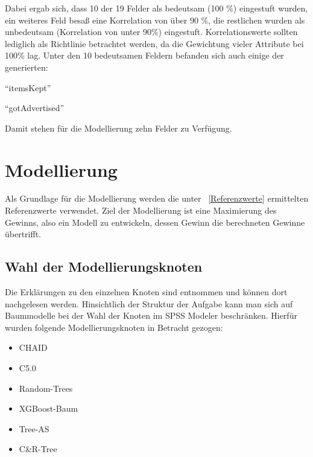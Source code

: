 \documentclass[a4paper,12pt]{article}
\begin{document}
Dabei ergab sich, dass 10 der 19 Felder als bedeutsam (100 \%) eingestuft wurden, ein weiteres Feld besaß eine Korrelation von über 90 \%,
die restlichen wurden als unbedeutsam (Korrelation von unter 90\%) eingestuft.
Korrelationswerte sollten lediglich als Richtlinie betrachtet werden, da die Gewichtung
vieler Attribute bei 100\% lag.  Unter den 10 bedeutsamen Feldern befanden sich auch einige der
generierten:

\vspace{0.2cm}
\par
	\begin{minipage}[h]{.5\textwidth}
	\begin{center}
	"`itemsKept"'
	\end{center}
	\end{minipage}
	\hfill
	\begin{minipage}[h]{.5\textwidth}
	\begin{center}
	"`gotAdvertised"'
	\end{center}
	\end{minipage}
	\vspace{0.2cm}
\par
Damit stehen für die Modellierung zehn Felder zu Verfügung.
\section{Modellierung}
Als Grundlage für die Modellierung werden die unter ~\ref{Referenzwerte} ermittelten Referenzwerte verwendet. Ziel der Modellierung ist eine Maximierung des Gewinns, also ein Modell zu entwickeln, dessen Gewinn die berechneten Gewinne übertrifft.  
\subsection{Wahl der Modellierungsknoten}
Die Erklärungen zu den einzelnen Knoten sind \cite{nodes} entnommen und können dort nachgelesen werden. 
Hinsichtlich der Struktur der Aufgabe kann man sich auf Baummodelle bei der Wahl der Knoten im SPSS Modeler beschränken. Hierfür wurden folgende Modellierungsknoten in Betracht gezogen:
\begin{itemize}
\item CHAID
\item C5.0
	\item Random-Trees
	\item XGBoost-Baum
	\item Tree-AS
	\item C\&R-Tree
\end{itemize} 
\end{document}
